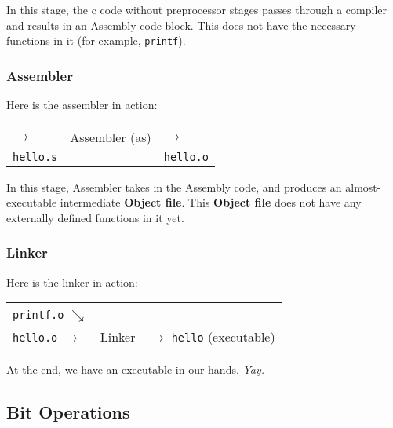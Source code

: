 \documentclass{article}
\begin{document}
In this stage, the c code without preprocessor stages passes through a compiler and results in an Assembly code block. This does not have the necessary functions in it (for example, \texttt{printf}).
\vspace{10px}

\subsubsection{Assembler}
Here is the assembler in action: \\
\begin{center}
\begin{table}[ht!]
\centering
\begin{tabular}{lll}
\cline{2-2}
\multicolumn{1}{l|}{$\rightarrow$} & \multicolumn{1}{l|}{Assembler (as)} & $\rightarrow$       \\ \cline{2-2}
\texttt{hello.s}               &                        & \texttt{hello.o}
\end{tabular}
\end{table}
\end{center}
In this stage, Assembler takes in the Assembly code, and produces an almost-executable intermediate \textbf{Object file}. This \textbf{Object file} does not have any externally defined functions in it yet.

\subsubsection{Linker}
Here is the linker in action: \\
\begin{center}
\begin{table}[ht!]
\centering
\begin{tabular}{lll}
\texttt{printf.o} $\searrow$                        &                             &                             \\ \cline{2-2}
\multicolumn{1}{l|}{\texttt{hello.o} $\rightarrow$} & \multicolumn{1}{l|}{Linker} &$\rightarrow$ \texttt{hello} (executable) \\ \cline{2-2}
\end{tabular}
\end{table}

At the end, we have an executable in our hands. \textit{Yay.}
\end{center}

\subsection{Bit Operations}
\end{document}

